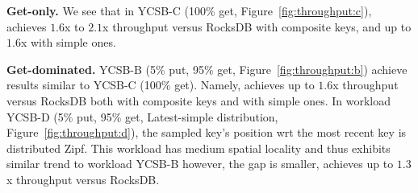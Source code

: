 
{\bf Get-only.} 
We see that in YCSB-C (100\% get, Figure~\ref{fig:throughput:c}), 
\sys\/ achieves $1.6$x to $2.1$x throughput versus RocksDB with composite keys,
and up to $1.6$x   with simple ones.   

{\bf Get-dominated.} 
YCSB-B (5\% put, 95\% get, Figure~\ref{fig:throughput:b}) achieve results similar  to YCSB-C (100\% get).
Namely, \sys\/ achieves up to $1.6$x throughput versus RocksDB both with composite keys and with simple ones.   
In workload YCSB-D (5\% put, 95\% get, Latest-simple distribution, Figure~\ref{fig:throughput:d}), the sampled key's position wrt the most recent key is distributed Zipf. This
workload has medium spatial locality and thus exhibits similar trend to workload YCSB-B however, the gap is smaller, \sys\/ achieves up to $1.3$x throughput versus RocksDB.


